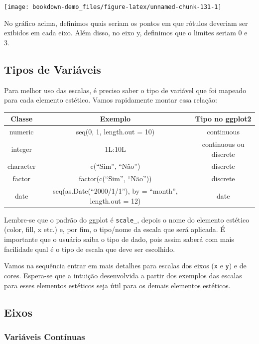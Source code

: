 \documentclass[]{book}
\begin{document}
\begin{center}\texttt{[image: bookdown-demo\_files/figure-latex/unnamed-chunk-131-1]} \end{center}

No gráfico acima, definimos quais seriam os pontos em que rótulos
deveriam ser exibidos em cada eixo. Além disso, no eixo y, definimos que
o limites seriam 0 e 3.

\subsection{Tipos de Variáveis}\label{tipos-de-variaveis}

Para melhor uso das escalas, é preciso saber o tipo de variável que foi
mapeado para cada elemento estético. Vamos rapidamente montar essa
relação:

\begin{longtable}[]{@{}ccc@{}}
\toprule
Classe & Exemplo & Tipo no ggplot2\tabularnewline
\midrule
\endhead
numeric & seq(0, 1, length.out = 10) & continuous\tabularnewline
integer & 1L:10L & continuous ou discrete\tabularnewline
character & c(``Sim'', ``Não'') & discrete\tabularnewline
factor & factor(c(``Sim'', ``Não'')) & discrete\tabularnewline
date & seq(as.Date(``2000/1/1''), by = ``month'', length.out = 12) &
date\tabularnewline
\bottomrule
\end{longtable}

Lembre-se que o padrão do ggplot é \texttt{scale\_}, depois o nome do
elemento estético (color, fill, x etc.) e, por fim, o tipo/nome da
escala que será aplicada. É importante que o usuário saiba o tipo de
dado, pois assim saberá com mais facilidade qual é o tipo de escala que
deve ser escolhido.

Vamos na sequência entrar em mais detalhes para escalas dos eixos
(\texttt{x} e \texttt{y}) e de cores. Espera-se que a intuição
desenvolvida a partir dos exemplos das escalas para esses elementos
estéticos seja útil para os demais elementos estéticos.

\subsection{Eixos}\label{eixos}

\subsubsection{Variáveis Contínuas}\label{variaveis-continuas}
\end{document}
